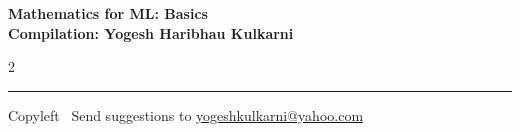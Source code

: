 \documentclass[8pt,landscape]{article}
\begin{document}
\footnotesize


\begin{center}
\Large{\textbf{Mathematics for ML: Basics\\ Compilation: Yogesh Haribhau Kulkarni}}
\end{center}

\begin{multicols}{2}

\end{multicols}

\rule{\linewidth}{0.25pt}
\scriptsize
Copyleft \textcopyleft\  Send suggestions to
\href{http://www.yogeshkulkarni.com}{yogeshkulkarni@yahoo.com}
\end{document}
